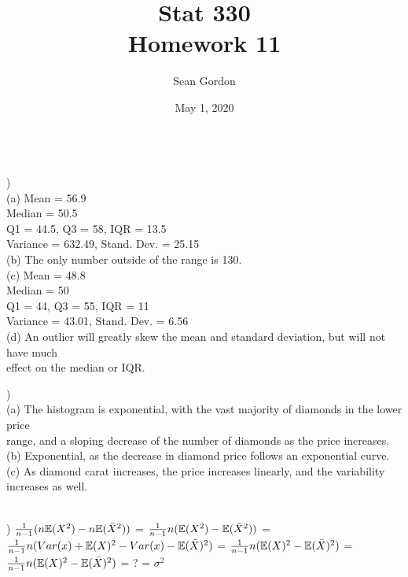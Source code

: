 \documentclass[12pt]{article}
\title{Stat 330\\Homework 11}
\author{Sean Gordon}
\date{May 1, 2020}
\begin{document}
\maketitle


\noindent\hrulefill \\[-.8em]


)\\
\indent (a) Mean = 56.9\\
\indent \indent Median = 50.5\\
\indent \indent Q1 = 44.5, Q3 = 58, IQR = 13.5\\
\indent \indent Variance = 632.49, Stand. Dev. = 25.15\\

\indent (b) The only number outside of the range is 130.\\

\indent (c) Mean = 48.8\\
\indent \indent Median = 50\\
\indent \indent Q1 = 44, Q3 = 55, IQR = 11\\
\indent \indent Variance = 43.01, Stand. Dev. = 6.56\\

\indent (d) An outlier will greatly skew the mean and standard deviation, but will not have much\\
\indent \indent effect on the median or IQR.\\


\noindent \hrulefill 


)\\
\indent (a) The histogram is exponential, with the vast majority of diamonds in the lower price \\
\indent \indent range, and a sloping decrease of the number of diamonds as the price increases.\\

\indent (b) Exponential, as the decrease in diamond price follows an exponential curve.\\

\indent (c) As diamond carat increases, the price increases linearly, and the variability \\
\indent \indent increases as well.\\


\noindent \hrulefill \\
\pagebreak


)  ${\Large \frac{1}{n-1}}(n\mathbb{E}(X^2) - n\mathbb{E}(\bar{X}^2))$ = ${\Large \frac{1}{n-1}}n(\mathbb{E}(X^2) - \mathbb{E}(\bar{X}^2))$ = \\[.4em]
\indent  ${\Large \frac{1}{n-1}}n(Var(x) + \mathbb{E}(X)^2 - Var(x) - \mathbb{E}(\bar{X})^2)$ = ${\Large \frac{1}{n-1}}n(\mathbb{E}(X)^2 - \mathbb{E}(\bar{X})^2)$ = \\[.4em]
\indent  ${\Large \frac{1}{n-1}}n(\mathbb{E}(X)^2 - \mathbb{E}(\bar{X})^2)$ = ? = $\sigma^2$\\
\end{document}
